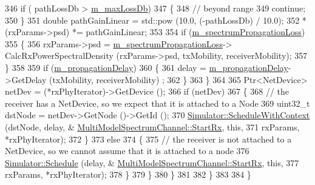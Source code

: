 \begin{DoxyCode}
346                   \textcolor{keywordflow}{if} ( pathLossDb > \hyperlink{classns3_1_1MultiModelSpectrumChannel_ace74651203888ff5d63dfae0c96b0979}{m\_maxLossDb})
347                     \{
348                       \textcolor{comment}{// beyond range}
349                       \textcolor{keywordflow}{continue};
350                     \}
351                   \textcolor{keywordtype}{double} pathGainLinear = std::pow (10.0, (-pathLossDb) / 10.0);
352                   *(rxParams->psd) *= pathGainLinear;              
353 
354                   \textcolor{keywordflow}{if} (\hyperlink{classns3_1_1MultiModelSpectrumChannel_a669cb9c95a0a28cc26473ffea7640eab}{m\_spectrumPropagationLoss})
355                     \{
356                       rxParams->psd = \hyperlink{classns3_1_1MultiModelSpectrumChannel_a669cb9c95a0a28cc26473ffea7640eab}{m\_spectrumPropagationLoss}->
      CalcRxPowerSpectralDensity (rxParams->psd, txMobility, receiverMobility);
357                     \}
358 
359                   \textcolor{keywordflow}{if} (\hyperlink{classns3_1_1MultiModelSpectrumChannel_a4a7d01850e693c72297d9d4a2faeb918}{m\_propagationDelay})
360                     \{
361                       delay = \hyperlink{classns3_1_1MultiModelSpectrumChannel_a4a7d01850e693c72297d9d4a2faeb918}{m\_propagationDelay}->GetDelay (txMobility, receiverMobility)
      ;
362                     \}
363                 \}
364 
365               Ptr<NetDevice> netDev = (*rxPhyIterator)->GetDevice ();
366                 \textcolor{keywordflow}{if} (netDev)
367                 \{
368                   \textcolor{comment}{// the receiver has a NetDevice, so we expect that it is attached to a Node}
369                   uint32\_t dstNode =  netDev->GetNode ()->GetId ();
370                   \hyperlink{classns3_1_1Simulator_a86dbaef45a15a42365d7d2ae550449f6}{Simulator::ScheduleWithContext} (dstNode, delay, &
      \hyperlink{classns3_1_1MultiModelSpectrumChannel_a9d8671b1d127dd0838b7efff971cacce}{MultiModelSpectrumChannel::StartRx}, \textcolor{keyword}{this},
371                                                   rxParams, *rxPhyIterator);
372                 \}
373               \textcolor{keywordflow}{else}
374                 \{
375                   \textcolor{comment}{// the receiver is not attached to a NetDevice, so we cannot assume that it is attached
       to a node}
376                   \hyperlink{classns3_1_1Simulator_a671882c894a08af4a5e91181bf1eec13}{Simulator::Schedule} (delay, &
      \hyperlink{classns3_1_1MultiModelSpectrumChannel_a9d8671b1d127dd0838b7efff971cacce}{MultiModelSpectrumChannel::StartRx}, \textcolor{keyword}{this},
377                                        rxParams, *rxPhyIterator);
378                 \}
379             \}
380         \}
381 
382     \}
383 
384 \}
\end{DoxyCode}


